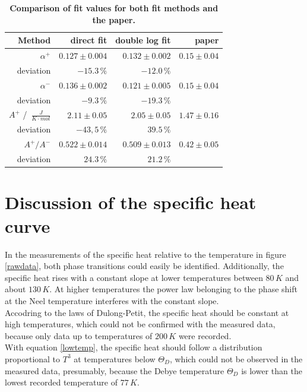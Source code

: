 \documentclass{include/thesisclass3}
\newcommand{\cc}{\cdot}
\newcommand{\e}[1]{\,\si{#1}}
\begin{document}
\begin{table}[H]
\centering
\caption{\label{neeltable}\textbf{Comparison of fit values for both fit methods and the paper.}}
\begin{tabular}{r|rrr}

\toprule
Method & direct fit & double log fit & paper \\
\midrule
$\alpha^+$ 						&	$0.127 \pm 0.004$	&	$0.132 \pm 0.002$&	$0.15\pm 0.04$	\\		
deviation						&	$-15.3\e{\%}$		&	$-12.0\e{\%}$		&\\
\midrule
$\alpha^-$ 						&	$0.136 \pm 0.002$	&	$0.121 \pm 0.005$&	$0.15\pm 0.04$	\\
deviation 						&	$-9.3\e{\%}$			&	$-19.3\e{\%}$	&\\
\midrule
$A^+$ / $\e{\frac{J}{K \cc mol}}$&	$2.11 \pm 0.05$		&	$2.05 \pm 0.05$	&	$1.47\pm 0.16$	\\
deviation 						&	$-43,5\e{\%}$		&	$39.5\e{\%}$		&\\
\midrule
$A^+/A^-$ 						&	$0.522 \pm 0.014$	&	$0.509 \pm 0.013$&	$0.42\pm 0.05$	\\
deviation						&		$24.3\e{\%}$		&	$21.2\e{\%}$		&\\
\midrule
\end{tabular}
\end{table}

\section{Discussion of the specific heat curve}
In the measurements of the specific heat relative to the temperature in figure \ref{rawdata}, both phase transitions could easily be identified. 
Additionally, the specific heat rises with a constant slope at lower temperatures between $80\e{K}$ and about $130\e{K}$. 
At higher temperatures the power law belonging to the phase shift at the Neel temperature interferes with the constant slope.\\
Accodring to the laws of Dulong-Petit, the specific heat should be constant at high temperatures, which could not be confirmed with the measured data, because only data up to temperatures of $200\e{K}$ were recorded.\\
With equation \ref{lowtemp}, the specific heat should follow a distribution proportional to $T^3$ at temperatures below $\Theta_D$, which could not be observed in the measured data, presumably, because the Debye temperature $\Theta_D$ is lower than the lowest recorded temperature of $77\e{K}$.
\end{document}
